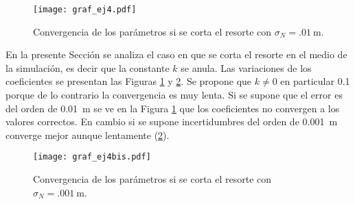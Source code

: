 

	\begin{figure}[h!]
		\centering
		\texttt{[image: graf\_ej4.pdf]}
		\caption{Convergencia de los parámetros si se corta el resorte con $\sigma_N = \SI{.01}{\m}$.}
		\label{fig:ej4}
	\end{figure}

	En la presente Sección se analiza el caso en que se corta el resorte en el medio de la simulación, es decir que la constante $k$ se anula. Las variaciones de los coeficientes se presentan las Figuras \ref{fig:ej4} y \ref{fig:ej4bis}. 
	Se propone que $k\neq0$ en particular \num{.1} porque de lo contrario la convergencia es muy lenta. Si se supone que el error es del orden de \SI{.01}{\m} se ve en la Figura \ref{fig:ej4} que los coeficientes no convergen a los valores correctos. En cambio si se supone incertidumbres del orden de \SI{0.001}{\m} converge mejor aunque lentamente (\ref{fig:ej4bis}). 

	\begin{figure}[h!]
		\centering
		\texttt{[image: graf\_ej4bis.pdf]}
		\caption{Convergencia de los parámetros si se corta el resorte con $\sigma_N = \SI{.001}{\m}$.}
		\label{fig:ej4bis}
	\end{figure}




